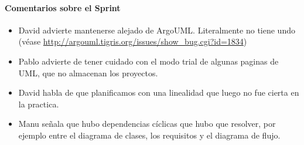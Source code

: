 \documentclass[a4paper, 12pt, spanish]{memoria}
\begin{document}
\paragraph{Comentarios sobre el Sprint}
\begin{itemize}
\item David advierte mantenerse alejado de ArgoUML. Literalmente no tiene undo (véase \url{http://argouml.tigris.org/issues/show_bug.cgi?id=1834})
\item Pablo advierte de tener cuidado con el modo trial de algunas paginas de UML, que no almacenan los proyectos.
\item David habla de que planificamos con una linealidad que luego no fue cierta en la practica.
\item Manu señala que hubo dependencias cíclicas que hubo que resolver, por ejemplo entre el diagrama de clases, los requisitos y el diagrama de flujo.
\end{itemize}

\end{document}
